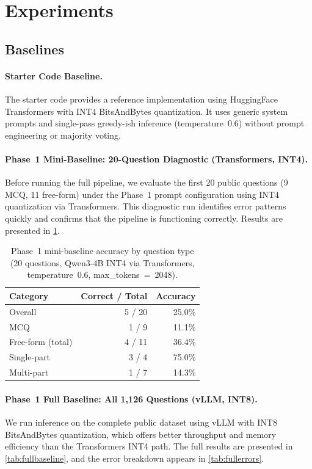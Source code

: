 \documentclass{article}
\begin{document}
\section{Experiments}
\label{sec:experiments}

\subsection{Baselines}
\label{sec:baselines}

\paragraph{Starter Code Baseline.}
The starter code provides a reference implementation using HuggingFace Transformers with INT4 BitsAndBytes quantization. It uses generic system prompts and single-pass greedy-ish inference (temperature~0.6) without prompt engineering or majority voting.

\paragraph{Phase~1 Mini-Baseline: 20-Question Diagnostic (Transformers, INT4).}
Before running the full pipeline, we evaluate the first 20 public questions (9 MCQ, 11 free-form) under the Phase~1 prompt configuration using INT4 quantization via Transformers. This diagnostic run identifies error patterns quickly and confirms that the pipeline is functioning correctly. Results are presented in \cref{tab:minibaseline}.

\begin{table}[h]
  \caption{Phase~1 mini-baseline accuracy by question type (20 questions, Qwen3-4B INT4 via Transformers, temperature~0.6, max\_tokens~=~2048).}
  \label{tab:minibaseline}
  \centering
  \begin{tabular}{lrr}
    \toprule
    Category & Correct / Total & Accuracy \\
    \midrule
    Overall & 5 / 20 & 25.0\% \\
    MCQ & 1 / 9 & 11.1\% \\
    Free-form (total) & 4 / 11 & 36.4\% \\
    \quad Single-part & 3 / 4 & 75.0\% \\
    \quad Multi-part & 1 / 7 & 14.3\% \\
    \bottomrule
  \end{tabular}
\end{table}

\paragraph{Phase~1 Full Baseline: All 1,126 Questions (vLLM, INT8).}
We run inference on the complete public dataset using vLLM with INT8 BitsAndBytes quantization, which offers better throughput and memory efficiency than the Transformers INT4 path. The full results are presented in \cref{tab:fullbaseline}, and the error breakdown appears in \cref{tab:fullerrors}.
\end{document}
